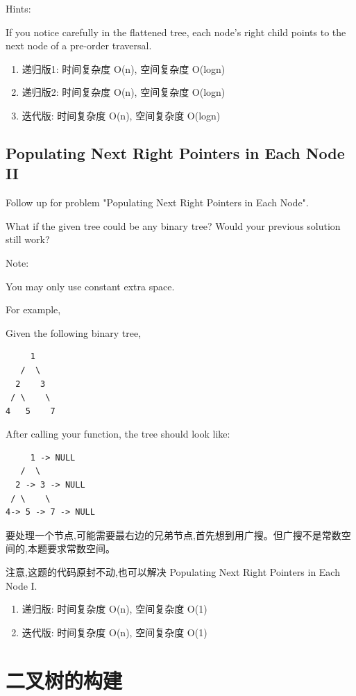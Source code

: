 \documentclass[12pt]{book}
\begin{document}
Hints:

If you notice carefully in the flattened tree, each node's right child points to the next node of a pre-order traversal.
\begin{enumerate}
\item 递归版1: 时间复杂度 O(n), 空间复杂度 O(logn)
\label{sec-4-1-11-1}
\item 递归版2: 时间复杂度 O(n), 空间复杂度 O(logn)
\label{sec-4-1-11-2}
\item 迭代版: 时间复杂度 O(n), 空间复杂度 O(logn)
\label{sec-4-1-11-3}
\end{enumerate}


\subsection{Populating Next Right Pointers in Each Node II}
\label{sec-4-1-12}
Follow up for problem "Populating Next Right Pointers in Each Node".

What if the given tree could be any binary tree? Would your previous solution still work?

Note:

You may only use constant extra space.

For example,

Given the following binary tree,
\lstset{language=java,label= ,caption= ,numbers=none}
\begin{lstlisting}
     1
   /  \
  2    3
 / \    \
4   5    7
\end{lstlisting}

After calling your function, the tree should look like:
\lstset{language=java,label= ,caption= ,numbers=none}
\begin{lstlisting}
     1 -> NULL
   /  \
  2 -> 3 -> NULL
 / \    \
4-> 5 -> 7 -> NULL
\end{lstlisting}

要处理一个节点,可能需要最右边的兄弟节点,首先想到用广搜。但广搜不是常数空间的,本题要求常数空间。

注意,这题的代码原封不动,也可以解决 Populating Next Right Pointers in Each Node I.
\begin{enumerate}
\item 递归版: 时间复杂度 O(n), 空间复杂度 O(1)
\label{sec-4-1-12-1}
\item 迭代版: 时间复杂度 O(n), 空间复杂度 O(1)
\label{sec-4-1-12-2}
\end{enumerate}



\section{二叉树的构建}
\label{sec-4-2}
\end{document}
